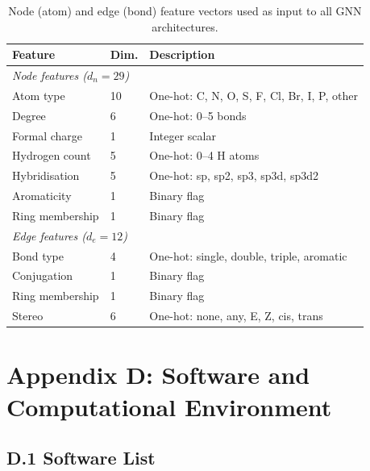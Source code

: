\begin{table}[H]
\caption{Node (atom) and edge (bond) feature vectors
         used as input to all GNN architectures.}
\label{tab:app_features}
\centering
\begin{tabular}{@{}p{3cm}p{2cm}p{8cm}@{}}
\toprule
\textbf{Feature} & \textbf{Dim.} & \textbf{Description} \\
\midrule
\multicolumn{3}{l}{\textit{Node features ($d_n = 29$)}} \\
Atom type       & 10 & One-hot: C, N, O, S, F, Cl, Br, I, P, other \\
Degree          & 6  & One-hot: 0--5 bonds \\
Formal charge   & 1  & Integer scalar \\
Hydrogen count  & 5  & One-hot: 0--4 H atoms \\
Hybridisation   & 5  & One-hot: sp, sp2, sp3, sp3d, sp3d2 \\
Aromaticity     & 1  & Binary flag \\
Ring membership & 1  & Binary flag \\
\midrule
\multicolumn{3}{l}{\textit{Edge features ($d_e = 12$)}} \\
Bond type       & 4  & One-hot: single, double, triple, aromatic \\
Conjugation     & 1  & Binary flag \\
Ring membership & 1  & Binary flag \\
Stereo          & 6  & One-hot: none, any, E, Z, cis, trans \\
\bottomrule
\end{tabular}
\end{table}


\clearpage
\section*{Appendix D: Software and Computational
          Environment}
\label{app:software}

\subsection*{D.1 Software List}

